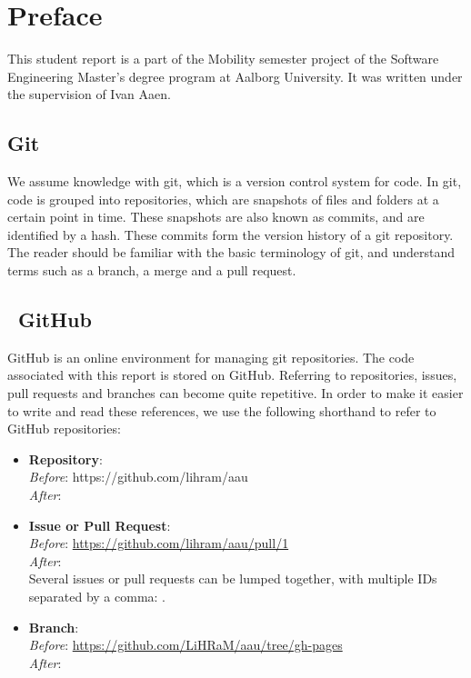 \chapter*{Preface}
This student report is a part of the Mobility semester project of the Software Engineering Master's degree program at Aalborg University.
It was written under the supervision of Ivan Aaen.

\section*{Git}

We assume knowledge with git\cite{git}, which is a version control system for code.
In git, code is grouped into repositories, which are snapshots of files and folders at a certain point in time.
These snapshots are also known as commits, and are identified by a hash.
These commits form the version history of a git repository.
The reader should be familiar with the basic terminology of git, and understand terms such as a branch, a merge and a pull request.


\section*{\faGithub~GitHub}
GitHub is an online environment for managing git repositories.
The code associated with this report is stored on GitHub.
Referring to repositories, issues, pull requests and branches can become quite repetitive.
In order to make it easier to write and read these references, we use the following shorthand to refer to GitHub repositories:
\begin{itemize}
      \item{
            \textbf{Repository}: \\
            \textit{Before}: https://github.com/lihram/aau\\
            \textit{After}: 
            }
      \item{
            \textbf{Issue or Pull Request}: \\
            \textit{Before}: \url{https://github.com/lihram/aau/pull/1}\\
            \textit{After}: \\
            Several issues or pull requests can be lumped together, with multiple IDs separated by a comma: .
            }
      \item{
            \textbf{Branch}: \\
            \textit{Before}: \url{https://github.com/LiHRaM/aau/tree/gh-pages}\\
            \textit{After}: 
            }
\end{itemize}

\listoftodos{}
